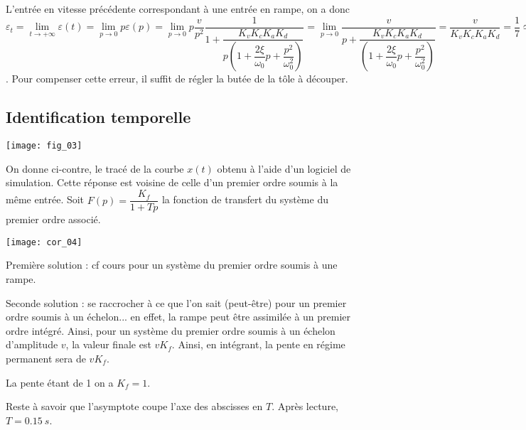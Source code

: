 \ifprof \begin{corrige}
L'entrée en vitesse précédente correspondant à une entrée en rampe, on a donc 
$
\varepsilon_t
= \lim\limits_{t\to +\infty} \varepsilon (t)
= \lim\limits_{p\to 0} p\varepsilon (p)
= \lim\limits_{p\to 0} p \dfrac{v}{p^2}\dfrac{1}{1+\dfrac{K_vK_cK_aK_d}{p\left( 1+\dfrac{2\xi}{\omega_0} p + \dfrac{p^2}{\omega_0^2} \right)}}
= \lim\limits_{p\to 0}  \dfrac{v}{p+\dfrac{K_vK_cK_aK_d}{\left( 1+\dfrac{2\xi}{\omega_0} p + \dfrac{p^2}{\omega_0^2} \right)}}
=\dfrac{v}{K_vK_cK_aK_d}
=\dfrac{1}{7}\simeq \SI{0,14}{m} $.
Pour compenser cette erreur, il suffit de régler la butée de la tôle à découper.
\end{corrige} \else \fi


\subsection*{Identification temporelle}
\ifprof
\else

\begin{marginfigure}
\centering
\texttt{[image: fig\_03]}
\end{marginfigure}

On donne ci-contre, le tracé de la courbe $x(t)$ obtenu à l'aide d'un logiciel de simulation.
Cette réponse est voisine de celle d'un premier ordre soumis à la même entrée.
Soit $F(p)=\dfrac{K_f}{1+Tp}$ la fonction de transfert du système du premier ordre associé.


\fi

\ifprof
\begin{marginfigure}
\centering
\texttt{[image: cor\_04]}
\end{marginfigure}

 \begin{corrige}

Première solution : cf cours pour un système du premier ordre soumis à une rampe. 

Seconde solution : se raccrocher à ce que l'on sait (peut-être) pour un premier ordre soumis à un échelon... en effet, la rampe peut être assimilée à un premier ordre intégré. Ainsi, pour un système du premier ordre soumis à un échelon d'amplitude $v$, la valeur finale est $vK_f$. Ainsi, en intégrant, la pente en régime permanent sera de $vK_f$. 

La pente étant de 1 on a $K_f=1$. 

Reste à savoir que l'asymptote coupe l'axe des abscisses en $T$. Après lecture, $T=\SI{0,15}{s}$.
\end{corrige} 
\else \fi





